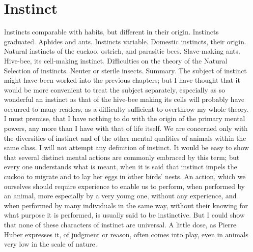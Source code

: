 \chapter{Instinct}
Instincts comparable with habits, but different in their origin. Instincts graduated. Aphides and ants. Instincts variable. Domestic instincts, their origin. Natural instincts of the cuckoo, ostrich, and parasitic bees. Slave-making ants. Hive-bee, its cell-making instinct. Difficulties on the theory of the Natural Selection of instincts. Neuter or sterile insects. Summary.
The subject of instinct might have been worked into the previous chapters; but I have thought that it would be more convenient to treat the subject separately, especially as so wonderful an instinct as that of the hive-bee making its cells will probably have occurred to many readers, as a difficulty sufficient to overthrow my whole theory. I must premise, that I have nothing to do with the origin of the primary mental powers, any more than I have with that of life itself. We are concerned only with the diversities of instinct and of the other mental qualities of animals within the same class.
I will not attempt any definition of instinct. It would be easy to show that several distinct mental actions are commonly embraced by this term; but every one understands what is meant, when it is said that instinct impels the cuckoo to migrate and to lay her eggs in other birds' nests. An action, which we ourselves should require experience to enable us to perform, when performed by an animal, more especially by a very young one, without any experience, and when performed by many individuals in the same way, without their knowing for what purpose it is performed, is usually said to be instinctive. But I could show that none of these characters of instinct are universal. A little dose, as Pierre Huber expresses it, of judgment or reason, often comes into play, even in animals very low in the scale of nature.
